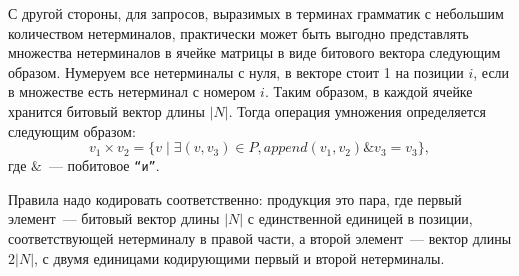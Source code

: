 \begin{algorithm}

\end{algorithm}

С другой стороны, для запросов, выразимых в терминах грамматик с небольшим количеством нетерминалов, практически может быть выгодно представлять множества нетерминалов в ячейке матрицы в виде битового вектора следующим образом.
Нумеруем все нетерминалы с нуля, в векторе стоит 1 на позиции $i$, если в множестве есть нетерминал с номером $i$.
Таким образом, в каждой ячейке хранится битовый вектор длины $|N|$.
Тогда операция умножения определяется следующим образом:
\[v_1 \times v_2 = \{v \mid \exists (v,v_3) \in P, \textit{append}(v_1, v_2) \& v_3 = v_3\},\] где $\&$~--- побитовое \texttt{``и''}.

Правила надо кодировать соответственно: продукция это пара, где первый элемент~--- битовый вектор длины $|N|$ с единственной единицей в позиции, соответствующей нетерминалу в правой части, а второй элемент~--- вектор длины $2|N|$, с двумя единицами кодирующими первый и второй нетерминалы.

